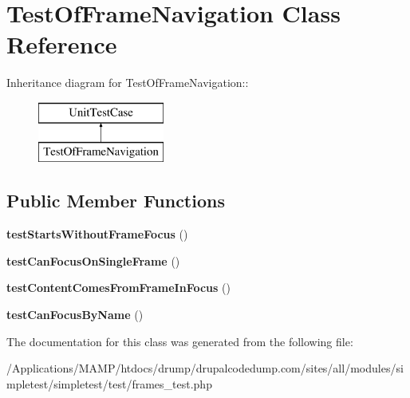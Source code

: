 \hypertarget{class_test_of_frame_navigation}{
\section{TestOfFrameNavigation Class Reference}
\label{class_test_of_frame_navigation}
}
Inheritance diagram for TestOfFrameNavigation::\begin{figure}[H]
\begin{center}
\leavevmode
\includegraphics[height=2cm]{class_test_of_frame_navigation}
\end{center}
\end{figure}
\subsection*{Public Member Functions}
\begin{DoxyCompactItemize}
\item 
\hypertarget{class_test_of_frame_navigation_a40ad4252554ab88b3e514f591be7cc68}{
{\bfseries testStartsWithoutFrameFocus} ()}
\label{class_test_of_frame_navigation_a40ad4252554ab88b3e514f591be7cc68}

\item 
\hypertarget{class_test_of_frame_navigation_a852e4e53c5e217c227958fbce68cfd57}{
{\bfseries testCanFocusOnSingleFrame} ()}
\label{class_test_of_frame_navigation_a852e4e53c5e217c227958fbce68cfd57}

\item 
\hypertarget{class_test_of_frame_navigation_ac3d0ade4cecc693e3180e40459c938d0}{
{\bfseries testContentComesFromFrameInFocus} ()}
\label{class_test_of_frame_navigation_ac3d0ade4cecc693e3180e40459c938d0}

\item 
\hypertarget{class_test_of_frame_navigation_a33ec77153c1d71a55290304656537261}{
{\bfseries testCanFocusByName} ()}
\label{class_test_of_frame_navigation_a33ec77153c1d71a55290304656537261}

\end{DoxyCompactItemize}


The documentation for this class was generated from the following file:\begin{DoxyCompactItemize}
\item 
/Applications/MAMP/htdocs/drump/drupalcodedump.com/sites/all/modules/simpletest/simpletest/test/frames\_\-test.php\end{DoxyCompactItemize}
